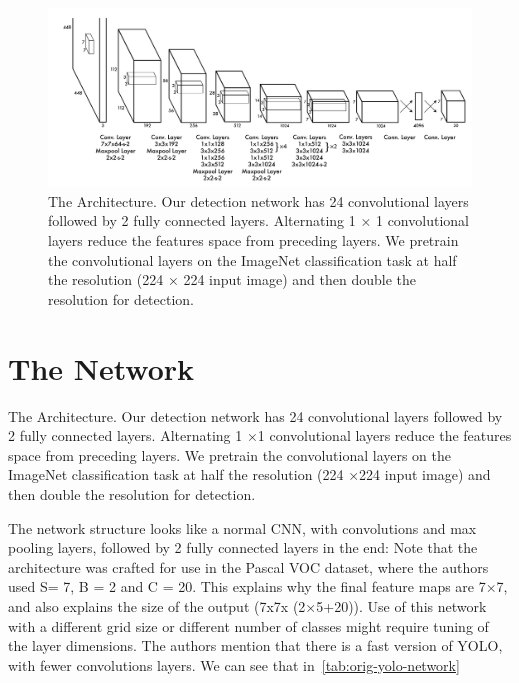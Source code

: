 \begin{figure}[h]
    \centering
    \includegraphics[max width=\textwidth]{images/ours/layers.png}
   \caption[The YOLOv5 Architecture]{ The Architecture. Our detection network has 24 convolutional layers followed
by 2 fully connected layers. Alternating 1 × 1 convolutional layers reduce the
features space from preceding layers. We pretrain the convolutional layers on the
ImageNet classification task at half the resolution (224 × 224 input image) and
then double the resolution for detection.
 }
    \label{fig:yolo-layers}
\end{figure}

\section{The Network}
The Architecture. Our detection network has 24 convolutional layers followed
by 2 fully connected layers. Alternating 1 ×1 convolutional layers reduce the
features space from preceding layers. We pretrain the convolutional layers on
the ImageNet classification task at half the resolution (224 ×224 input image)
and then double the resolution for detection.


The network structure looks like a normal CNN, with convolutions and max pooling layers, followed by 2 fully connected layers in the end: Note that the architecture was crafted for use in the Pascal VOC dataset, where the authors used S= 7, B = 2 and C = 20. This explains why the final feature maps are 7×7, and also explains the size of the output (7x7x (2×5+20)). Use of this network with a different grid size or different number of classes might require tuning of the layer dimensions. The authors mention that there is a fast version of YOLO, with fewer convolutions layers. We can see that in~\ref{tab:orig-yolo-network}



